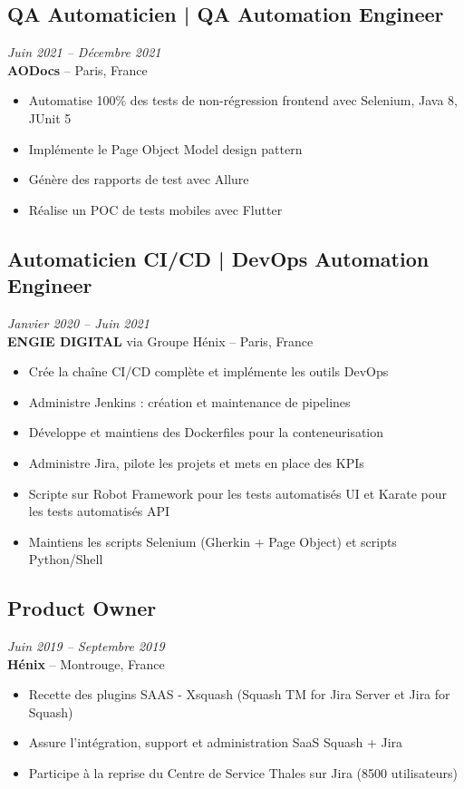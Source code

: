 \documentclass[11pt,a4paper]{article}
\begin{document}
\subsection*{QA Automaticien | QA Automation Engineer} \hfill \textit{Juin 2021 -- Décembre 2021}\\
\textbf{AODocs} -- Paris, France
\begin{itemize}
    \item Automatise 100\% des tests de non-régression frontend avec Selenium, Java 8, JUnit 5
    \item Implémente le Page Object Model design pattern
    \item Génère des rapports de test avec Allure
    \item Réalise un POC de tests mobiles avec Flutter
\end{itemize}

\subsection*{Automaticien CI/CD | DevOps Automation Engineer} \hfill \textit{Janvier 2020 -- Juin 2021}\\
\textbf{ENGIE DIGITAL} via Groupe Hénix -- Paris, France
\begin{itemize}
    \item Crée la chaîne CI/CD complète et implémente les outils DevOps
    \item Administre Jenkins : création et maintenance de pipelines
    \item Développe et maintiens des Dockerfiles pour la conteneurisation
    \item Administre Jira, pilote les projets et mets en place des KPIs
    \item Scripte sur Robot Framework pour les tests automatisés UI et Karate pour les tests automatisés API
    \item Maintiens les scripts Selenium (Gherkin + Page Object) et scripts Python/Shell
\end{itemize}

\subsection*{Product Owner} \hfill \textit{Juin 2019 -- Septembre 2019}\\
\textbf{Hénix} -- Montrouge, France
\begin{itemize}
    \item Recette des plugins SAAS - Xsquash (Squash TM for Jira Server et Jira for Squash)
    \item Assure l'intégration, support et administration SaaS Squash + Jira
    \item Participe à la reprise du Centre de Service Thales sur Jira (8500 utilisateurs)
\end{itemize}
\end{document}
